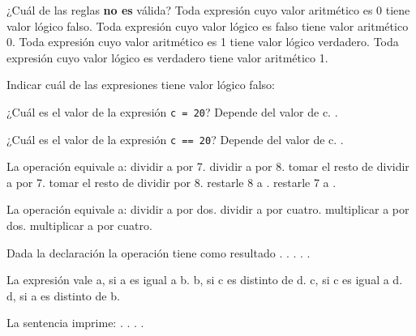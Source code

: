 \begin{preguntas}
\question ¿Cuál de las reglas \textbf{no es} válida?
\choice Toda expresión cuyo valor aritmético es 0 tiene valor lógico falso.
\choice Toda expresión cuyo valor lógico es falso tiene valor aritmético 0.
\choice Toda expresión cuyo valor aritmético es 1 tiene valor lógico verdadero.
\correctchoice Toda expresión cuyo valor lógico es verdadero tiene valor aritmético 1.

\question Indicar cuál de las expresiones tiene valor lógico falso:
\choice {}
\choice {}
\correctchoice {}
\choice {}

\question ¿Cuál es el valor de la expresión \lstinline{c = 20}?
\choice Depende del valor de c.
.

\question ¿Cuál es el valor de la expresión \lstinline{c == 20}?
\correctchoice Depende del valor de c.
.

\question La operación  equivale a:
\choice dividir a  por 7.
\choice dividir a  por 8.
\choice tomar el resto de dividir a  por 7.
\correctchoice tomar el resto de dividir  por 8.
\choice restarle 8 a .
\choice restarle 7 a .

\question La operación  equivale a:
\choice dividir a  por dos.
\correctchoice dividir a  por cuatro.
\choice multiplicar a  por dos.
\choice multiplicar a  por cuatro.

\question Dada la declaración  la operación  tiene como resultado
.
.
.
.
.

\question La expresión  vale
\choice a, si a es igual a b.
\choice b, si c es distinto de d.
\choice c, si c es igual a d.
\correctchoice d, si a es distinto de b.

\question La sentencia  imprime:
.
.
.
.

\end{preguntas}
